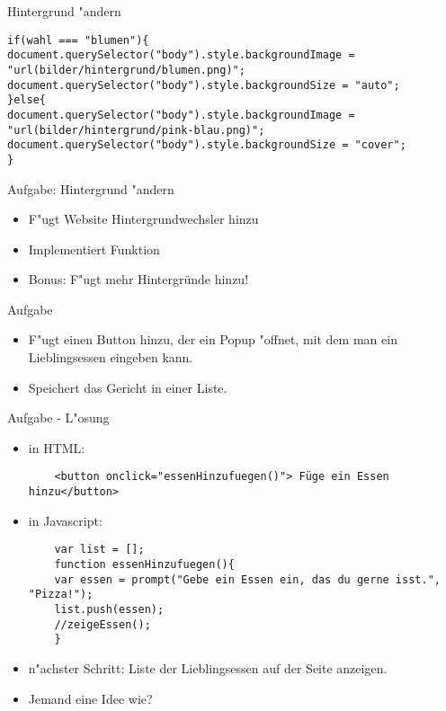 \documentclass[18pt]{beamer}
\begin{document}
\begin{frame}[fragile]{Hintergrund "andern }
\begin{lstlisting}
if(wahl === "blumen"){
document.querySelector("body").style.backgroundImage = "url(bilder/hintergrund/blumen.png)";
document.querySelector("body").style.backgroundSize = "auto";
}else{
document.querySelector("body").style.backgroundImage = "url(bilder/hintergrund/pink-blau.png)";
document.querySelector("body").style.backgroundSize = "cover";
}
\end{lstlisting}
\end{frame}


\begin{frame}[fragile]{Aufgabe: Hintergrund "andern }
\begin{itemize}
\item F"ugt Website Hintergrundwechsler hinzu
\item Implementiert Funktion
\item Bonus: F"ugt mehr Hintergründe hinzu!
\end{itemize}
\end{frame}


\begin{frame}[fragile]{Aufgabe}
\begin{itemize}
	\item F"ugt einen Button hinzu, der ein Popup "offnet, mit dem man ein Lieblingsessen eingeben kann.
	\item Speichert das Gericht in einer Liste.
\end{itemize}
\end{frame}

\begin{frame}[fragile]{Aufgabe - L"osung}
\begin{itemize}
 	\item in HTML:
 	\begin{lstlisting}
    <button onclick="essenHinzufuegen()"> Füge ein Essen hinzu</button>
 	\end{lstlisting}
 	\item in Javascript:
 	\begin{lstlisting}
 	var list = [];
 	function essenHinzufuegen(){
 	var essen = prompt("Gebe ein Essen ein, das du gerne isst.", "Pizza!");
 	list.push(essen);
 	//zeigeEssen();
 	}
 	\end{lstlisting}
 	\item n"achster Schritt: Liste der Lieblingsessen auf der Seite anzeigen. 
 	\item Jemand eine Idee wie?
\end{itemize}
\end{frame}
\end{document}
